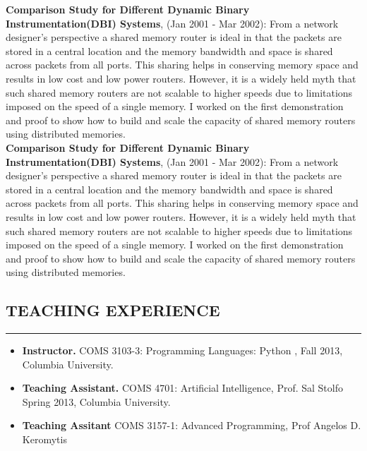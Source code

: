 \documentclass[10pt,a4]{article}
\begin{document}
\begin{small}
\begin{itemize}
%
  {\bf Comparison Study for Different Dynamic Binary Instrumentation(DBI)
    Systems}, (Jan 2001 - Mar 2002): From a network designer's perspective a
  shared memory router is ideal in that the packets are stored in a central
  location and the memory bandwidth and space is shared across packets from all
  ports. This sharing helps in conserving memory space and results in low cost
  and low power routers. However, it is a widely held myth that such shared
  memory routers are not scalable to higher speeds due to limitations imposed on
  the speed of a single memory. I worked on the first demonstration and proof to
  show how to build and scale the capacity of shared memory routers using
  distributed memories.\\
%
  {\bf Comparison Study for Different Dynamic Binary Instrumentation(DBI)
    Systems}, (Jan 2001 - Mar 2002): From a network designer's perspective a
  shared memory router is ideal in that the packets are stored in a central
  location and the memory bandwidth and space is shared across packets from all
  ports. This sharing helps in conserving memory space and results in low cost
  and low power routers. However, it is a widely held myth that such shared
  memory routers are not scalable to higher speeds due to limitations imposed on
  the speed of a single memory. I worked on the first demonstration and proof to
  show how to build and scale the capacity of shared memory routers using
  distributed memories.

\end{itemize}


\subsection*{TEACHING EXPERIENCE}
\hrule
\vspace{0.2cm}

\begin{itemize}

\item {\bf Instructor.} COMS 3103-3: Programming Languages: Python , Fall 2013,
  Columbia University.

\item {\bf Teaching Assistant.} COMS 4701: Artificial Intelligence, Prof. Sal Stolfo
Spring 2013, Columbia University.

\item {\bf Teaching Assitant} COMS 3157-1: Advanced Programming, Prof Angelos
  D. Keromytis


\end{itemize}
\end{small}
\end{document}
